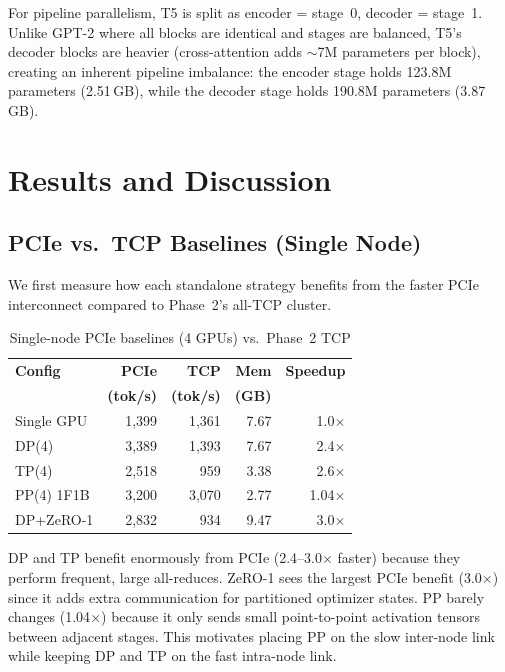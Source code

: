 \documentclass[conference]{IEEEtran}
\begin{document}
For pipeline parallelism, T5 is split as encoder = stage~0, decoder = stage~1. Unlike GPT-2 where all blocks are identical and stages are balanced, T5's decoder blocks are heavier (cross-attention adds $\sim$7M parameters per block), creating an inherent pipeline imbalance: the encoder stage holds 123.8M parameters (2.51\,GB), while the decoder stage holds 190.8M parameters (3.87\,GB).

\section{Results and Discussion}

\subsection{PCIe vs.\ TCP Baselines (Single Node)}

We first measure how each standalone strategy benefits from the faster PCIe interconnect compared to Phase~2's all-TCP cluster.

\begin{table}[h]
\centering
\caption{Single-node PCIe baselines (4 GPUs) vs.\ Phase~2 TCP}
\label{tab:pcie}
\small
\begin{tabular}{lrrrr}
\toprule
\textbf{Config} & \textbf{PCIe} & \textbf{TCP} & \textbf{Mem} & \textbf{Speedup} \\
 & \textbf{(tok/s)} & \textbf{(tok/s)} & \textbf{(GB)} & \\
\midrule
Single GPU & 1,399 & 1,361 & 7.67 & 1.0$\times$ \\
DP(4) & 3,389 & 1,393 & 7.67 & 2.4$\times$ \\
TP(4) & 2,518 & 959 & 3.38 & 2.6$\times$ \\
PP(4) 1F1B & 3,200 & 3,070 & 2.77 & 1.04$\times$ \\
DP+ZeRO-1 & 2,832 & 934 & 9.47 & 3.0$\times$ \\
\bottomrule
\end{tabular}
\end{table}

DP and TP benefit enormously from PCIe (2.4--3.0$\times$ faster) because they perform frequent, large all-reduces. ZeRO-1 sees the largest PCIe benefit (3.0$\times$) since it adds extra communication for partitioned optimizer states. PP barely changes (1.04$\times$) because it only sends small point-to-point activation tensors between adjacent stages. This motivates placing PP on the slow inter-node link while keeping DP and TP on the fast intra-node link.
\end{document}
